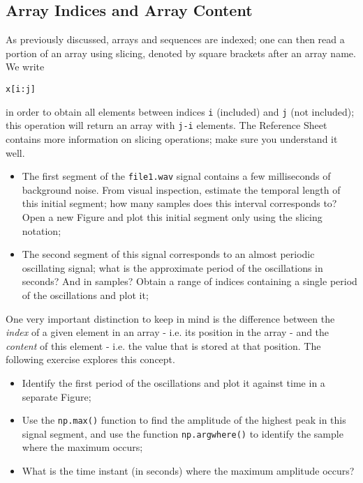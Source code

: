 \subsection{Array Indices and Array Content}

As previously discussed, arrays and sequences are indexed; one can then read a portion of an array using slicing, denoted by square brackets after an array name. We write

\begin{lstlisting}[frame=single]
x[i:j]
\end{lstlisting}

in order to obtain all elements between indices {\tt i} (included) and {\tt j} (not included); this operation will return an array with {\tt j-i} elements. The Reference Sheet contains more information on slicing operations; make sure you understand it well.

\begin{itemize}
	\item The first segment of the {\tt file1.wav} signal contains a few milliseconds of background noise. From visual inspection, estimate the temporal length of this initial segment; how many samples does this interval corresponds to? Open a new Figure and plot this initial segment only using the slicing notation;
	\item The second segment of this signal corresponds to an almost periodic oscillating signal; what is the approximate period of the oscillations in seconds? And in samples? Obtain a range of indices containing a single period of the oscillations and plot it;
\end{itemize}

One very important distinction to keep in mind is the difference between the \emph{index} of a given element in an array - i.e. its position in the array - and the \emph{content} of this element - i.e. the value that is stored at that position. The following exercise explores this concept.

\begin{itemize}
	\item Identify the first period of the oscillations and plot it against time in a separate Figure;
	\item Use the {\tt np.max()} function to find the amplitude of the highest peak in this signal segment, and use the function {\tt np.argwhere()} to identify the sample where the maximum occurs;
	\item What is the time instant (in seconds) where the maximum amplitude occurs?
\end{itemize}


